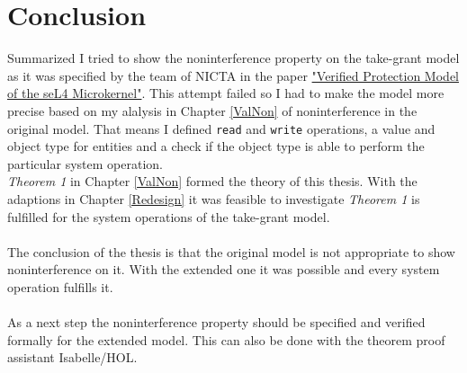 \chapter{Conclusion}
Summarized I tried to show the noninterference property on the take-grant model as it was specified by the team of NICTA in the paper \href{http://ts.data61.csiro.au/publications/nicta_full_text/1474.pdf}{%
		"Verified Protection Model of the seL4 Microkernel"}\cite{TakeG}. This attempt failed so I had to make the model more precise based on my alalysis in Chapter \ref{ValNon} of noninterference in the original model. That means I defined \texttt{read} and \texttt{write} operations, a value and object type for entities and a check if the object type is able to perform the particular system operation. \\
		\textit{Theorem 1} in Chapter \ref{ValNon} formed the theory of this thesis. 
		With the adaptions in Chapter \ref{Redesign} it was feasible to investigate \textit{Theorem 1} is fulfilled for the system operations of the take-grant model. \\ \\
		The conclusion of the thesis is that the original model is not appropriate to show noninterference on it. With the extended one it was possible and every system operation fulfills it. \\ \\
		As a next step the noninterference property should be specified and verified formally for the extended model. This can also be done with the theorem proof assistant Isabelle/HOL.  